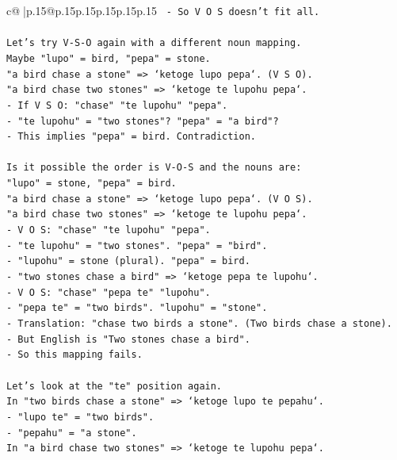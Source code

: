 \documentclass{article}
\begin{document}
{\begin{supertabular}{c@{$\;$}|p{.15\linewidth}@{}p{.15\linewidth}p{.15\linewidth}p{.15\linewidth}p{.15\linewidth}p{.15\linewidth}}
{{{\texttt{                     {-} So V O S doesn't fit all.} \\
\\ 
\texttt{Let's try V{-}S{-}O again with a different noun mapping.} \\
\texttt{Maybe "lupo" = bird, "pepa" = stone.} \\
\texttt{"a bird chase a stone" => `ketoge lupo pepa`. (V S O).} \\
\texttt{"a bird chase two stones" => `ketoge te lupohu pepa`.} \\
\texttt{{-} If V S O: "chase" "te lupohu" "pepa".} \\
\texttt{{-} "te lupohu" = "two stones"? "pepa" = "a bird"?} \\
\texttt{{-} This implies "pepa" = bird. Contradiction.} \\
\\ 
\texttt{Is it possible the order is V{-}O{-}S and the nouns are:} \\
\texttt{"lupo" = stone, "pepa" = bird.} \\
\texttt{"a bird chase a stone" => `ketoge lupo pepa`. (V O S).} \\
\texttt{"a bird chase two stones" => `ketoge te lupohu pepa`.} \\
\texttt{{-} V O S: "chase" "te lupohu" "pepa".} \\
\texttt{{-} "te lupohu" = "two stones". "pepa" = "bird".} \\
\texttt{{-} "lupohu" = stone (plural). "pepa" = bird.} \\
\texttt{{-} "two stones chase a bird" => `ketoge pepa te lupohu`.} \\
\texttt{{-} V O S: "chase" "pepa te" "lupohu".} \\
\texttt{{-} "pepa te" = "two birds". "lupohu" = "stone".} \\
\texttt{{-} Translation: "chase two birds a stone". (Two birds chase a stone).} \\
\texttt{{-} But English is "Two stones chase a bird".} \\
\texttt{{-} So this mapping fails.} \\
\\ 
\texttt{Let's look at the "te" position again.} \\
\texttt{In "two birds chase a stone" => `ketoge lupo te pepahu`.} \\
\texttt{{-} "lupo te" = "two birds".} \\
\texttt{{-} "pepahu" = "a stone".} \\
\texttt{In "a bird chase two stones" => `ketoge te lupohu pepa`.} \\
}}}
\end{supertabular}}
\end{document}
